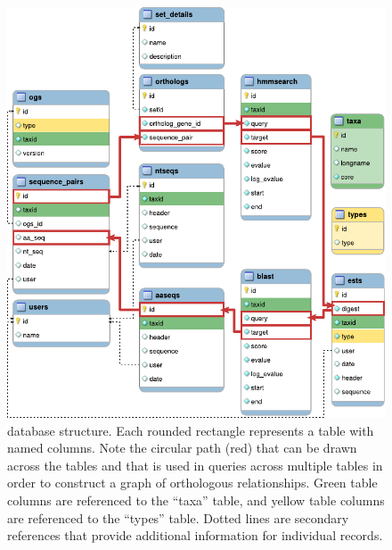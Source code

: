 \begin{figure}[h!]
	\centering
	\includegraphics[width=\textwidth]{img/dbstructure.pdf}
	\caption[Complete \pname database structure]{
		\pname database structure. Each rounded rectangle represents a table with
		named columns. Note the circular path (red) that can be drawn across the
		tables and that is used in queries across multiple tables in order to
		construct a graph of orthologous relationships. Green table columns are
		referenced to the ``taxa'' table, and yellow table columns are referenced to
		the ``types'' table. Dotted lines are secondary references that provide
		additional information for individual records.
	}
	\label{fig:dbstructure}
\end{figure}



